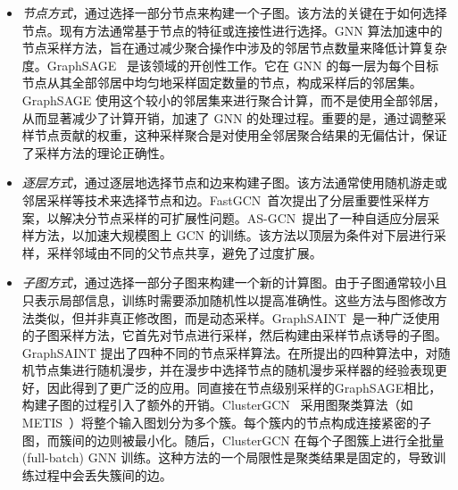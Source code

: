 \begin{itemize}
    \item \textit{节点方式}，通过选择一部分节点来构建一个子图。该方法的关键在于如何选择节点。现有方法通常基于节点的特征或连接性进行选择。GNN 算法加速中的节点采样方法，旨在通过减少聚合操作中涉及的邻居节点数量来降低计算复杂度。GraphSAGE~\cite{sage} 是该领域的开创性工作。它在 GNN 的每一层为每个目标节点从其全部邻居中均匀地采样固定数量的节点，构成采样后的邻居集。GraphSAGE 使用这个较小的邻居集来进行聚合计算，而不是使用全部邻居，从而显著减少了计算开销，加速了 GNN 的处理过程。重要的是，通过调整采样节点贡献的权重，这种采样聚合是对使用全邻居聚合结果的无偏估计，保证了采样方法的理论正确性。
    \item \textit{逐层方式}，通过逐层地选择节点和边来构建子图。该方法通常使用随机游走或邻居采样等技术来选择节点和边。FastGCN~\cite{chen2018fastgcn}首次提出了分层重要性采样方案，以解决分节点采样的可扩展性问题。AS-GCN~\cite{huang2018adaptive}提出了一种自适应分层采样方法，以加速大规模图上 GCN 的训练。该方法以顶层为条件对下层进行采样，采样邻域由不同的父节点共享，避免了过度扩展。
    \item \textit{子图方式}，通过选择一部分子图来构建一个新的计算图。由于子图通常较小且只表示局部信息，训练时需要添加随机性以提高准确性。这些方法与图修改方法类似，但并非真正修改图，而是动态采样。GraphSAINT~\cite{zeng2019graphsaint}是一种广泛使用的子图采样方法，它首先对节点进行采样，然后构建由采样节点诱导的子图。GraphSAINT 提出了四种不同的节点采样算法。在所提出的四种算法中，对随机节点集进行随机漫步，并在漫步中选择节点的随机漫步采样器的经验表现更好，因此得到了更广泛的应用。同直接在节点级别采样的GraphSAGE相比，构建子图的过程引入了额外的开销。ClusterGCN~\cite{chiang2019cluster} 采用图聚类算法（如 METIS~\cite{metis}）将整个输入图划分为多个簇。每个簇内的节点构成连接紧密的子图，而簇间的边则被最小化。随后，ClusterGCN 在每个子图簇上进行全批量 (full-batch) GNN 训练。这种方法的一个局限性是聚类结果是固定的，导致训练过程中会丢失簇间的边。
\end{itemize}

